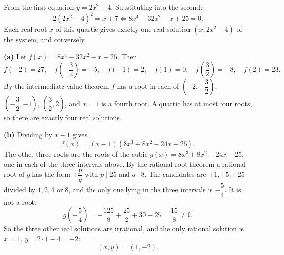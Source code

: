 From the first equation $y=2x^2-4$. Substituting into the second:
\[
2(2x^2-4)^2=x+7\iff 8x^4-32x^2-x+25=0 .
\]
Each real root $x$ of this quartic gives exactly one real solution $(x,2x^2-4)$ of the system, and conversely.

\textbf{(a)} Let $f(x)=8x^4-32x^2-x+25$. Then
\[
f(-2)=27,\quad f\left(-\dfrac{3}{2}\right)=-5,\quad f(-1)=2,\quad f(1)=0,\quad f\left(\dfrac{3}{2}\right)=-8,\quad f(2)=23 .
\]
By the intermediate value theorem $f$ has a root in each of $\left(-2,-\dfrac{3}{2}\right)$, $\left(-\dfrac{3}{2},-1\right)$, $\left(\dfrac{3}{2},2\right)$, and $x=1$ is a fourth root. A quartic has at most four roots, so there are exactly four real solutions.

\textbf{(b)} Dividing by $x-1$ gives
\[
f(x)=(x-1)(8x^3+8x^2-24x-25).
\]
The other three roots are the roots of the cubic $g(x)=8x^3+8x^2-24x-25$, one in each of the three intervals above. By the rational root theorem a rational root of $g$ has the form $\pm\dfrac{p}{q}$ with $p\mid25$ and $q\mid8$. The candidates are $\pm1,\pm5,\pm25$ divided by $1,2,4$ or $8$, and the only one lying in the three intervals is $-\dfrac{5}{4}$. It is not a root:
\[
g\left(-\dfrac{5}{4}\right)=-\dfrac{125}{8}+\dfrac{25}{2}+30-25=\dfrac{15}{8}\ne0 .
\]
So the three other real solutions are irrational, and the only rational solution is $x=1$, $y=2\cdot1-4=-2$:
\[
\boxed{(x,y)=(1,-2)}.
\]
